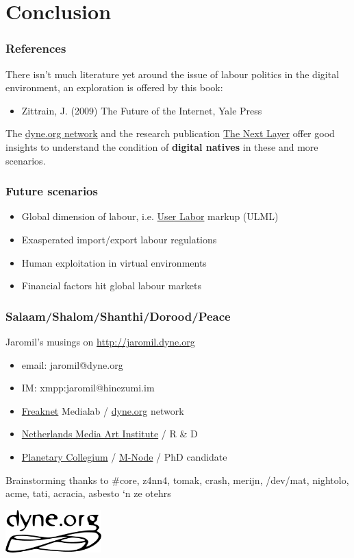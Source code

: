 \documentclass{beamer}
\begin{document}
\section{Conclusion}
\label{sec-8}
\begin{frame}
\frametitle{References}
\label{sec-8_1}


There isn't much literature yet around the issue of labour politics in
the digital environment, an exploration is offered by this book:

\begin{itemize}
\item Zittrain, J. (2009) The Future of the Internet, Yale Press
\end{itemize}


The \href{http://planet.dyne.org}{dyne.org network} and the research publication \href{http://www.thenextlayer.org/}{The Next Layer} offer
good insights to understand the condition of \textbf{digital natives} in
these and more scenarios.
\end{frame}
\begin{frame}
\frametitle{Future scenarios}
\label{sec-8_2}


\begin{itemize}
\item Global dimension of labour, i.e. \href{http://userlabor.org}{User Labor} markup (ULML)
\item Exasperated import/export labour regulations
\item Human exploitation in virtual environments
\item Financial factors hit global labour markets
\end{itemize}
\end{frame}
\begin{frame}
\frametitle{Salaam/Shalom/Shanthi/Dorood/Peace}
\label{sec-8_3}


Jaromil's musings on \href{http://jaromil.dyne.org/journal}{http://jaromil.dyne.org}

\begin{itemize}
\item email: jaromil@dyne.org
\item IM: xmpp:jaromil@hinezumi.im
\item \href{http://freaknet.org}{Freaknet} Medialab / \href{http://dyne.org}{dyne.org} network
\item \href{http://nimk.nl}{Netherlands Media Art Institute} / R \& D
\item \href{http://www.planetary-collegium.net/}{Planetary Collegium} / \href{http://www.planetary-collegium.net/}{M-Node} / PhD candidate
\end{itemize}


Brainstorming thanks to \#core, z4nn4, tomak, crash, merijn, /dev/mat,
nightolo, acme, tati, acracia, asbesto `n ze otehrs

\includegraphics[width=10em]{images/dyne-big.png}
\end{frame}
\end{document}
